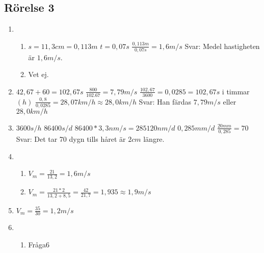 \documentclass[a4paper,11pt]{article}
\begin{document}
\begin{flushleft}
\subsection{Rörelse 3}
\begin{enumerate}
  \item \begin{enumerate}
    \item $ s=11,3cm=0,113m $\newline
    $ t=0,07s $\newline
    $ \frac{0,113m}{0,07s}=1,6m/s $\newline
    Svar: Medel hastigheten är $ 1,6m/s $.
    \item Vet ej.
  \end{enumerate}
  \item $ 42,67+60=102,67s $\newline
  $ \frac{800}{102.67}=7,79m/s $\newline
  \newline
  $ \frac{102,67}{3600}=0,0285 = 102,67s $ i timmar$(h)$\newline
  \newline
  $ \frac{0,8}{0,0285}=28,07km/h\approx28,0km/h $\newline
  \newline
  Svar: Han färdas $ 7,79m/s $ eller $ 28,0km/h $  
  
  \item $ 3600s/h $\newline
  $ 86400s/d $\newline
  $ 86400*3,3nm/s=285120nm/d $\newline
  $ 0,285mm/d $\newline
  $ \frac{20mm}{0,285}=70 $\newline
  Svar: Det tar 70 dygn tills håret är $2cm$ längre.
  \item \begin{enumerate}
    \item $ V_m=\frac{21}{13,2}=1,6m/s $\newline
    \item $ V_m=\frac{21*2}{13,2+8,5}=\frac{42}{21,7}=1,935\approx1,9m/s $\newline
  \end{enumerate}
  \item $ V_m=\frac{35}{30}=1,2m/s $
  \item \begin{enumerate}
    \item Fråga6
  \end{enumerate}
\end{enumerate}
\newpage

\end{flushleft}
\end{document}
